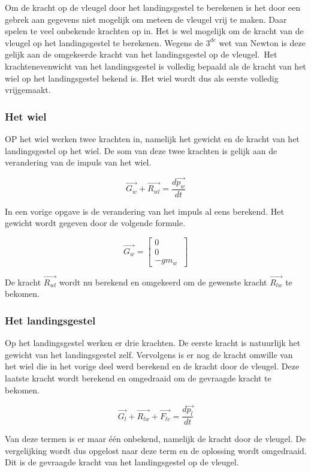 Om de kracht op de vleugel door het landingsgestel te berekenen is het door een gebrek aan gegevens niet mogelijk om meteen de vleugel vrij te maken. Daar spelen te veel onbekende krachten op in. Het is wel mogelijk om de kracht van de vleugel op het landingsgestel te berekenen. Wegens de $3^{de}$ wet van Newton is deze gelijk aan de omgekeerde kracht van het landingsgestel op de vleugel.\
Het krachtenevenwicht van het landingsgestel is volledig bepaald als de kracht van het wiel op het landingsgestel bekend is. Het wiel wordt dus als eerste volledig vrijgemaakt.

\subsubsection{Het wiel}
OP het wiel werken twee krachten in, namelijk het gewicht en de kracht van het landingsgestel op het wiel. De som van deze twee krachten is gelijk aan de verandering van de impuls van het wiel.

\begin{equation}
\overrightarrow{G_{w}}+\overrightarrow{R_{wl}}=\frac{d\overrightarrow{p_{w}}}{dt}
\end{equation}

In een vorige opgave is de verandering van het impuls al eens berekend. Het gewicht wordt gegeven door de volgende formule.

\begin{equation*}
\overrightarrow{G_{w}}
=	\begin{bmatrix}
	0\\
	0\\
	-gm_{w}\
	\end{bmatrix}
\end{equation*}

De kracht $\overrightarrow{R_{wl}}$ wordt nu berekend en omgekeerd om de gewenste kracht $\overrightarrow{R_{lw}}$ te bekomen.


\subsubsection{Het landingsgestel}
Op het landingsgestel werken er drie krachten. De eerste kracht is natuurlijk het gewicht van het landingsgestel zelf. Vervolgens is er nog de kracht omwille van het wiel die in het vorige deel werd berekend en de kracht door de vleugel. Deze laatste kracht wordt berekend en omgedraaid om de gevraagde kracht te bekomen.

\begin{equation}
\overrightarrow{G_{l}}+\overrightarrow{R_{lw}}+\overrightarrow{F_{lv}}=\frac{d\overrightarrow{p_{l}}}{dt}
\end{equation}

Van deze termen is er maar \'e\'en onbekend, namelijk de kracht door de vleugel. De vergelijking wordt dus opgelost naar deze term en de oplossing wordt omgedraaid. Dit is de gevraagde kracht van het landingsgestel op de vleugel.

